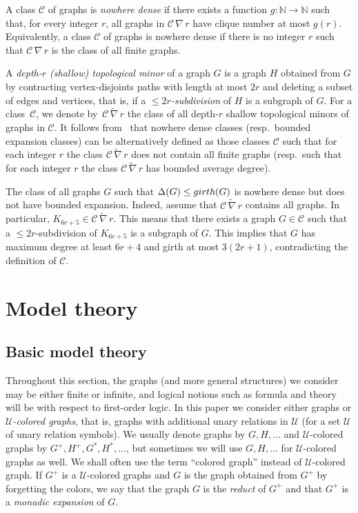 \documentclass{lmcs}
\newcommand{\Cc}{\mathscr{C}}
\newcommand{\Uu}{\mathcal{U}}
\theoremstyle{definition}
\begin{document}
A class $\Cc$ of graphs is  \emph{nowhere dense}
 if there exists a function $g\colon \mathbb N\rightarrow\mathbb N$ such that, for every integer $r$, all graphs in $\Cc\,\nabla\, r$ have clique number at most $g(r)$. Equivalently, a class $\Cc$ of graphs is nowhere dense if there is no integer $r$ such that  $\Cc\,\nabla\, r$  is the class of all finite graphs.

A  \emph{depth-$r$ (shallow) topological minor} of a graph $G$ is a graph $H$ obtained from $G$ by contracting vertex-disjoints paths with length at most $2r$ and deleting a subset of edges and vertices,  that is, if a \emph{$\leq 2r$-subdivision} of $H$ is a subgraph of $G$.
For a class~$\Cc$, we denote by~$\Cc\,\widetilde\nabla\, r$ the class of all depth-$r$ shallow topological minors of graphs in $\Cc$. It follows from~\cite{POMNI} that nowhere dense classes (resp.\ bounded expansion classes) can be alternatively defined as those classes 
$\Cc$ such that for each integer $r$ the class $\Cc\,\widetilde\nabla\, r$ does not contain all finite graphs (resp.\  such that for each integer $r$ the class $\Cc\,\widetilde\nabla\, r$  has bounded average degree).

\begin{exa}
	The class of all graphs $G$ such that $\Delta(G)\leq {\rm girth}(G)$ is nowhere dense but does not have bounded expansion.
	Indeed, assume that $\Cc\,\widetilde\nabla\, r$ contains all graphs. In particular, $K_{6r+5}\in \Cc\,\widetilde\nabla\, r$. This means that there exists a graph $G\in\Cc$ such that a $\leq 2r$-subdivision of $K_{6r+5}$ is a subgraph of $G$. This implies that $G$ has maximum degree at least $6r+4$ and girth at most $3(2r+1)$, contradicting the definition of $\Cc$.
\end{exa}
\section{Model theory}
\subsection{Basic model theory}
Throughout this section, the graphs (and more general structures) we consider may be either finite or infinite, and logical notions such as formula and theory will be with respect to first-order logic. In this paper we consider either graphs or {\em $\Uu$-colored
  graphs}, that is, graphs with additional unary relations in $\Uu$
(for a set $\Uu$ of unary relation symbols). We usually denote
graphs by $G,H,\ldots$ and $\Uu$-colored graphs by
$G^+,H^+,G^*,H^*,\ldots$, but sometimes we will use $G,H,\ldots$ for
$\Uu$-colored graphs as well. We shall often use the term ``colored graph'' instead of $\Uu$-colored graph.
If $G^+$ is a $\Uu$-colored graphs and $G$ is the graph obtained from $G^+$ by forgetting the colors, we say that the graph $G$ is the \emph{reduct} of $G^+$ and that $G^+$ is a \emph{monadic expansion} of $G$.
\end{document}
